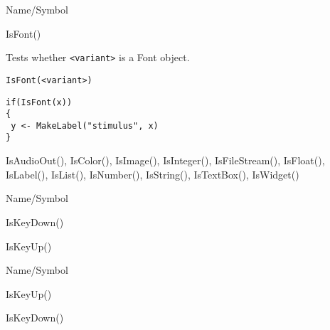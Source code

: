 \rl




\begin{desc}{Name/Symbol}
\item[Name/Symbol]	IsFont()

\item[Description]	Tests whether \verb+<variant>+ is a Font object.

\item[Usage]
\begin{verbatim}
IsFont(<variant>)
\end{verbatim}

\item[Example]	
\begin{verbatim}
if(IsFont(x))
{
 y <- MakeLabel("stimulus", x)
}
\end{verbatim}

\item[See Also]	IsAudioOut(), IsColor(), IsImage(), IsInteger(), 
		IsFileStream(), IsFloat(), IsLabel(), IsList(), 
		IsNumber(), IsString(), IsTextBox(), IsWidget()
\end{desc}

\rl




\begin{desc}{Name/Symbol}
\item[Name/Symbol]	IsKeyDown()

\item[Description]	

\item[Usage]		

\item[Example]	

\item[See Also]	IsKeyUp()
\end{desc}

\rl


\begin{desc}{Name/Symbol}
\item[Name/Symbol]	IsKeyUp()

\item[Description]	

\item[Usage]		

\item[Example]	

\item[See Also]	IsKeyDown()
\end{desc}

\rl


